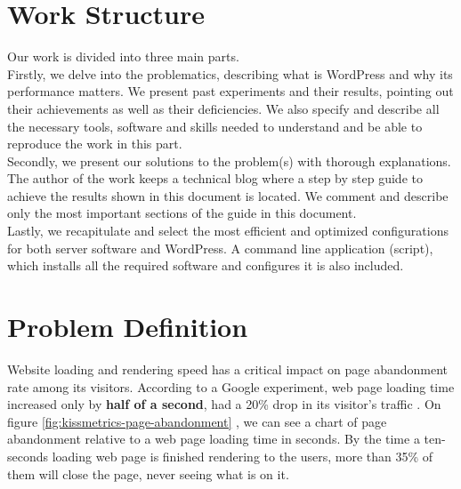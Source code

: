 \section{Work Structure}

Our work is divided into three main parts.  \\

Firstly, we delve into the problematics, describing what is WordPress and why its performance matters. We present past experiments and their results, pointing out their achievements as well as their deficiencies. We also specify and describe all the necessary tools, software and skills needed to understand and be able to reproduce the work in this part. \\

Secondly, we present our solutions to the problem(s) with thorough explanations. The author of the work keeps a technical blog \cite{Lamosty:blog} where a step by step guide to achieve the results shown in this document is located. We comment and describe only the most important sections of the guide in this document. \\

Lastly, we recapitulate and select the most efficient and optimized configurations for both server software and WordPress. A command line application (script), which installs all the required software and configures it is also included.

\section{Problem Definition}

Website loading and rendering speed has a critical impact on page abandonment rate among its visitors. According to a Google experiment, web page loading time increased only by \textbf{half of a second}, had a 20\% drop in its visitor’s traffic \cite{Study:Google}. On figure \ref{fig:kissmetrics-page-abandonment} \cite{Fig:Kissmetrics-page-abandonment}, we can see a chart of page abandonment relative to a web page loading time in seconds. By the time a ten-seconds loading web page is finished rendering to the users, more than 35\% of them will close the page, never seeing what is on it.

